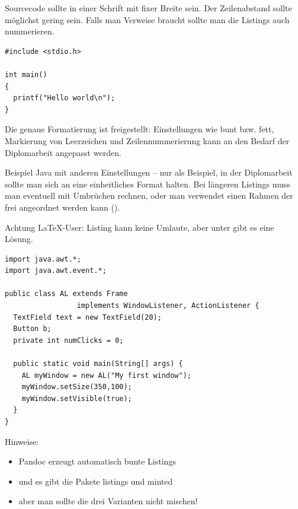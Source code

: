 Sourcecode sollte in einer Schrift mit fixer Breite sein. Der Zeilenabstand sollte möglichst gering sein.
Falls man Verweise braucht sollte man die Listings auch nummerieren.

\lstset{numbers=left, numberstyle=\tiny, stepnumber=2, numbersep=5pt, showspaces=true, frame=single}
\lstset{language=C}

\begin{lstlisting}
#include <stdio.h>

int main()
{
  printf("Hello world\n");
}
\end{lstlisting}

Die genaue Formatierung ist freigestellt: Einstellungen wie bunt bzw.
fett, Markierung von Leerzeichen und Zeilennummerierung kann an den
Bedarf der Diplomarbeit angepasst werden.

Beispiel Java mit anderen Einstellungen -- nur als Beispiel, in der
Diplomarbeit sollte man sich an eine einheitliches Format halten.
Bei längeren Listings muss man eventuell mit Umbrüchen rechnen, oder
man verwendet einen Rahmen der frei angeordnet werden kann ().

\lstset{numbers=right, numberstyle=\tiny, stepnumber=2, numbersep=5pt, showspaces=false, frame=single}
\lstset{language=Java}

Achtung \LaTeX{}-User: Listing kann keine Umlaute, aber unter \citep{listingtipp}
gibt es eine Lösung.

\begin{lstlisting}[caption={Java Beispiel},captionpos=b]
import java.awt.*;
import java.awt.event.*;

public class AL extends Frame
                 implements WindowListener, ActionListener {
  TextField text = new TextField(20);
  Button b;
  private int numClicks = 0;

  public static void main(String[] args) {
    AL myWindow = new AL("My first window");
    myWindow.setSize(350,100);
    myWindow.setVisible(true);
  }
}
\end{lstlisting}

\needspace{2cm}
Hinweise:
\begin{itemize}
\item Pandoc erzeugt automatisch bunte Listings
\item und es gibt die Pakete listings und minted
\item aber man sollte die drei Varianten nicht mischen!
\end{itemize}



